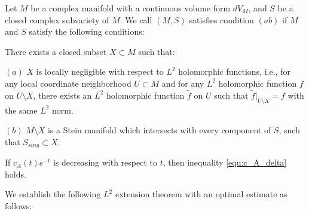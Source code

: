 \begin{defi}[Condition (ab)]
  Let $M$ be a complex manifold with a continuous volume form
  $dV_{M}$, and $S$ be a closed complex subvariety of $M$. We call
  $(M,S)$ satisfies condition $(ab)$ if $M$ and $S$ satisfy the
  following conditions:
  
  There exists a closed subset $X\subset M$ such that:
  
  $(a)$ $X$ is locally negligible with respect to $L^2$ holomorphic
  functions, i.e., for any local coordinate neighborhood $U\subset M$
  and for any $L^2$ holomorphic function $f$ on $U\setminus X$, there
  exists an $L^2$ holomorphic function $\tilde{f}$ on $U$ such that
  $\tilde{f}|_{U\setminus X}=f$ with the same $L^{2}$ norm.
  
  $(b)$ $M\setminus X$ is a Stein manifold which intersects with every component of $S$,
  such that $S_{sing}\subset X$.
  \end{defi}

If $c_{A}(t)e^{-t}$ is decreasing with respect to $t$, then
inequality \ref{equ:c_A_delta} holds.

We establish the following $L^{2}$ extension theorem with an optimal
estimate as follows:

